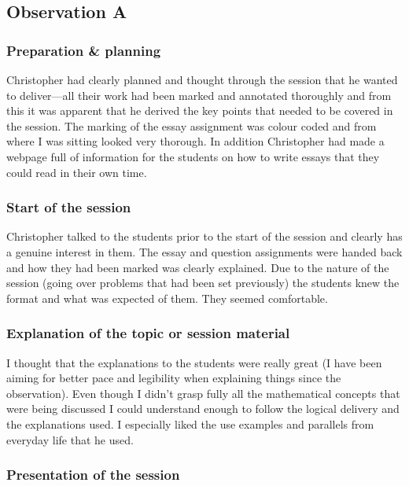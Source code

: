 \subsection{Observation A}\label{sec:me-A}

\subsubsection{Preparation \& planning}\label{sec:A-preparation}

Christopher had clearly planned and thought through the session that he wanted to deliver---all their work had been marked and annotated thoroughly and from this it was apparent that he derived the key points that needed to be covered in the session. The marking of the essay assignment was colour coded and from where I was sitting looked very thorough. In addition Christopher had made a webpage full of information for the students on how to write essays that they could read in their own time.

\subsubsection{Start of the session}\label{sec:A-start}

Christopher talked to the students prior to the start of the session and clearly has a genuine interest in them. The essay and question assignments were handed back and how they had been marked was clearly explained. Due to the nature of the session (going over problems that had been set previously) the students knew the format and what was expected of them. They seemed comfortable.

\subsubsection{Explanation of the topic or session material}\label{sec:A-topic}

I thought that the explanations to the students were really great (I have been aiming for better pace and legibility when explaining things since the observation). Even though I didn't grasp fully all the mathematical concepts that were being discussed I could understand enough to follow the logical delivery and the explanations used. I especially liked the use examples and parallels from everyday life that he used.

\subsubsection{Presentation of the session}\label{sec:A-presentation}

